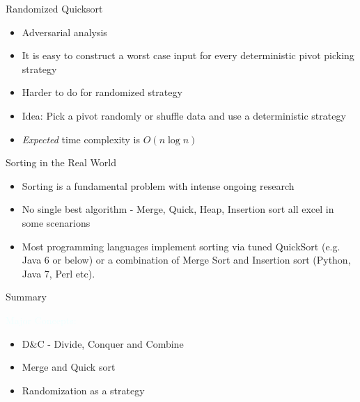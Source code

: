 \documentclass{beamer}
\newcommand{\tblue}[1]{{\Large {\textcolor{azure}{#1}}}}
\begin{document}
\begin{frame}{Randomized Quicksort}
\begin{itemize}
\item Adversarial analysis
\item It is easy to construct a worst case input for every deterministic pivot picking strategy 
\item Harder to do for randomized strategy
\item Idea: Pick a pivot randomly or shuffle data and use a deterministic strategy
\item {\em Expected} time complexity is $O(n \log n)$
\end{itemize}
\end{frame}


\begin{frame}{Sorting in the Real World}
\begin{itemize}
\item Sorting is a fundamental problem with intense ongoing research
\item No single best algorithm - Merge, Quick, Heap, Insertion sort all excel in some scenarions
\item Most programming languages implement sorting via tuned QuickSort (e.g. Java 6 or below) or 
a combination of Merge Sort and Insertion sort (Python, Java 7, Perl etc).
\end{itemize}
\end{frame}

\begin{frame}{Summary}

\tblue{Major Concepts:}
\begin{itemize}
\item D\&C - Divide, Conquer and Combine
\item Merge and Quick sort
\item Randomization as a strategy
\end{itemize}
\end{frame}
\end{document}
